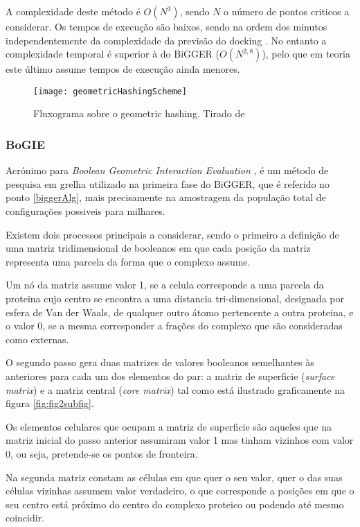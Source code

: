 A complexidade deste método é $O(N^{3})$, sendo $N$ o número de pontos criticos a considerar. Os tempos de execução são baixos, sendo na ordem dos minutos independentemente da complexidade da previsão do docking \cite{halperin}. No entanto a complexidade temporal é superior à do BiGGER ($O(N^{2,8})$), pelo que em teoria este último assume tempos de execução ainda menores.

\begin{figure}[ht]
  \centering
    {\texttt{[image: geometricHashingScheme]}}
  \caption{Fluxograma sobre o geometric hashing. Tirado de \cite{geometry}}
  \label{geometricFig}
\end{figure}

\subsubsection{BoGIE}
\label{bogieAlg}
Acrónimo para \textit{Boolean Geometric Interaction Evaluation}\cite{teseProf} \cite{biggerPaper}, é um método de pesquisa em grelha utilizado na primeira fase do BiGGER, que é referido no ponto \ref{biggerAlg}, mais precisamente na amostragem da população total de configurações possiveis para milhares.

 Existem dois processos principais a considerar, sendo o primeiro a definição de uma matriz tridimensional de booleanos em que cada posição da matriz representa uma parcela da forma que o complexo assume.
 
 Um nó da matriz assume valor 1, se a celula corresponde a uma parcela da proteina cujo centro se encontra a uma distancia tri-dimensional, designada por esfera de Van der Waals, de qualquer outro átomo pertencente a outra proteina, e o valor 0, se a mesma corresponder a frações do complexo que são consideradas como externas.

O segundo passo gera duas matrizes de valores booleanos semelhantes às anteriores para cada um dos elementos do par: a matriz de superficie (\textit{surface matrix}) e a matriz central (\textit{core matrix}) tal como está ilustrado graficamente na figura \ref{fig:fig2subfig}.

Os elementos celulares que ocupam a matriz de superficie são aqueles que na matriz inicial do passo anterior assumiram valor 1 mas tinham vizinhos com valor 0, ou seja, pretende-se os pontos de fronteira. 
 
 Na segunda matriz constam as células em que quer o seu valor, quer o das suas células vizinhas assumem valor verdadeiro, o que corresponde a posições em que o seu centro está próximo do centro do complexo proteico ou podendo até mesmo coincidir. 
 
